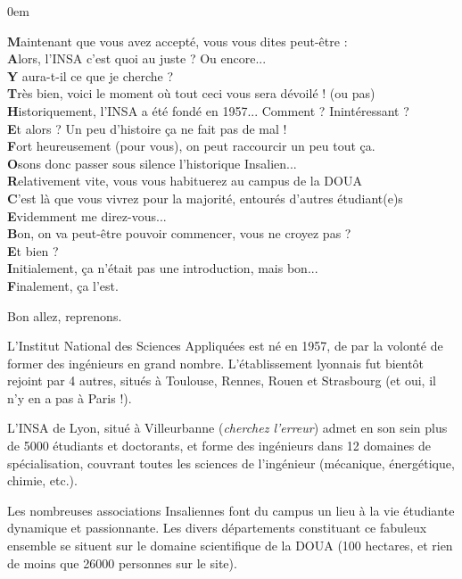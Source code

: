 \vspace{1em}
{
    \footnotesize
    \parindent 0em
    \begin{changemargin}{-1cm}{0cm}
\textbf{M}aintenant que vous avez accepté, vous vous dites peut-être :\\
\textbf{A}lors, l'INSA c'est quoi au juste ? Ou encore...\\
\textbf{Y} aura-t-il ce que je cherche ?\\

\textbf{T}rès bien, voici le moment où tout ceci vous sera dévoilé ! (ou pas)\\
\textbf{H}istoriquement, l'INSA a été fondé en 1957... Comment ? Inintéressant ?\\
\textbf{E}t alors ? Un peu d'histoire ça ne fait pas de mal !\\

\textbf{F}ort heureusement (pour vous), on peut raccourcir un peu tout ça.\\
\textbf{O}sons donc passer sous silence l'historique Insalien...\\
\textbf{R}elativement vite, vous vous habituerez au campus de la DOUA\\
\textbf{C}'est là que vous vivrez pour la majorité, entourés d'autres étudiant(e)s\\
\textbf{E}videmment me direz-vous...\\

\textbf{B}on, on va peut-être pouvoir commencer, vous ne croyez pas ?\\
\textbf{E}t bien ?\\

\textbf{I}nitialement, ça n'était pas une introduction, mais bon...\\
\textbf{F}inalement, ça l'est.\\
\end{changemargin}
} %

Bon allez, reprenons.

\vspace{1em}

L'Institut National des Sciences Appliquées est né en 1957, de par la volonté de
former des ingénieurs en grand nombre. L'établissement lyonnais fut bientôt 
rejoint par 4 autres, situés à Toulouse, Rennes, Rouen
et Strasbourg (et oui, il n'y en a pas à Paris !).

\vspace{1em}

L'INSA de Lyon, situé à Villeurbanne (\emph{cherchez l'erreur}) admet en son sein plus
de 5000 étudiants et doctorants, et forme des ingénieurs dans 12 domaines de
spécialisation, couvrant toutes les sciences de l'ingénieur (mécanique,
énergétique, chimie, etc.).

\vspace{1em}

Les nombreuses associations Insaliennes font du campus un lieu à la vie
étudiante dynamique et passionnante. Les divers départements constituant
ce fabuleux ensemble se situent sur le domaine scientifique de la DOUA (100 
hectares, et rien de moins que 26000 personnes sur le site).
